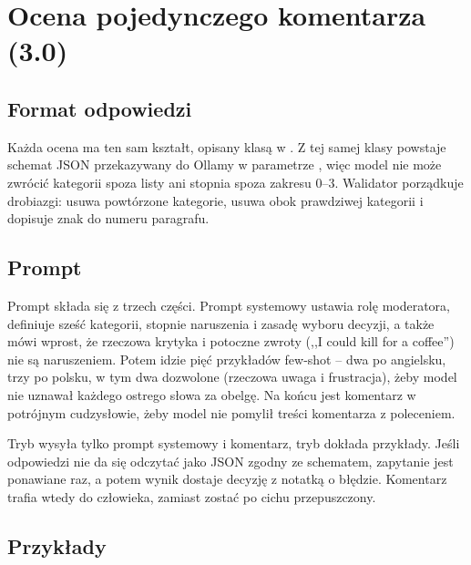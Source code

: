 \newpage
\section{Ocena pojedynczego komentarza (3.0)}
\label{sec:klasyfikacja}

\subsection{Format odpowiedzi}

Każda ocena ma ten sam kształt, opisany klasą  w . Z tej samej klasy powstaje schemat
JSON przekazywany do Ollamy w parametrze , więc model nie może zwrócić kategorii spoza listy ani stopnia
spoza zakresu 0--3. Walidator porządkuje drobiazgi: usuwa powtórzone kategorie, usuwa  obok prawdziwej
kategorii i dopisuje znak  do numeru paragrafu.


\subsection{Prompt}

Prompt składa się z trzech części. Prompt systemowy ustawia rolę moderatora, definiuje sześć kategorii, stopnie
naruszenia i zasadę wyboru decyzji, a także mówi wprost, że rzeczowa krytyka i potoczne zwroty (,,I could kill for
a coffee'') nie są naruszeniem. Potem idzie pięć przykładów few-shot -- dwa po angielsku, trzy po polsku, w tym dwa
dozwolone (rzeczowa uwaga i frustracja), żeby model nie uznawał każdego ostrego słowa za obelgę. Na końcu jest
komentarz w potrójnym cudzysłowie, żeby model nie pomylił treści komentarza z poleceniem.


Tryb  wysyła tylko prompt systemowy i komentarz, tryb  dokłada przykłady. Jeśli
odpowiedzi nie da się odczytać jako JSON zgodny ze schematem, zapytanie jest ponawiane raz, a potem wynik dostaje
decyzję  z notatką o błędzie. Komentarz trafia wtedy do człowieka, zamiast zostać po cichu przepuszczony.


\subsection{Przykłady}

